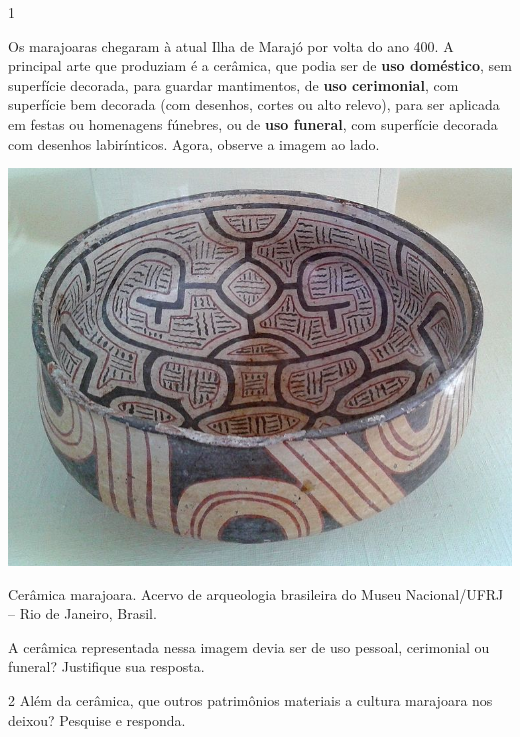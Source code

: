 \pagebreak
{}

\num{1}

\begin{minipage}{.5\textwidth}
Os marajoaras chegaram à atual Ilha de Marajó por volta do ano 400. A principal arte que produziam é a cerâmica, que podia ser de \textbf{uso doméstico}, sem superfície decorada, para guardar mantimentos, de \textbf{uso cerimonial}, com superfície bem decorada (com desenhos, cortes ou alto relevo), para ser aplicada em festas ou homenagens fúnebres, ou de \textbf{uso funeral}, com superfície decorada com desenhos labirínticos. Agora, observe a imagem ao lado.
\end{minipage}\hspace{.5cm}
\begin{minipage}{.5\textwidth}
\includegraphics[width=\textwidth]{./imgs/art24.jpg}

Cerâmica marajoara. Acervo de arqueologia brasileira do Museu Nacional/UFRJ – Rio de Janeiro, Brasil.
\end{minipage}\bigskip

\noindent{}A cerâmica representada nessa imagem devia ser de uso pessoal, cerimonial ou funeral? Justifique sua resposta.



\num{2}  Além da cerâmica, que outros patrimônios materiais a cultura marajoara nos deixou? Pesquise e responda.



